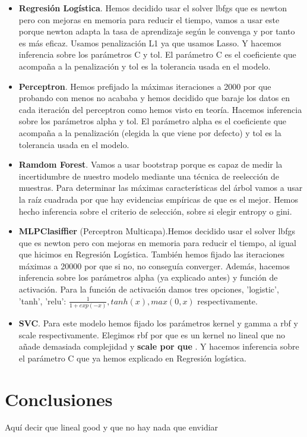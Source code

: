 \documentclass[a4paper,11pt]{article}
\begin{document}
\begin{itemize}

\item \textbf{Regresión Logística}. Hemos decidido usar el solver lbfgs que es newton pero con mejoras en memoria para reducir el tiempo, vamos a usar este porque newton adapta la tasa de aprendizaje según le convenga y por tanto es más eficaz. Usamos penalización L1 ya que usamos Lasso. Y hacemos inferencia sobre los parámetros C y tol. El parámetro C es el coeficiente que acompaña a la penalización y tol es la tolerancia usada en el modelo.

\item \textbf{Perceptron}. Hemos prefijado la máximas iteraciones a 2000 por que probando con menos no acababa y hemos decidido que baraje los datos en cada iteración del perceptron como hemos visto en teoría. Hacemos inferencia sobre los parámetros alpha y tol. El parámetro alpha es el coeficiente que acompaña a la penalización (elegida la que viene por defecto) y tol es la tolerancia usada en el modelo.

\item \textbf{Ramdom Forest}. Vamos a usar bootstrap porque es capaz de medir la incertidumbre de nuestro modelo mediante una técnica de reelección de muestras. Para determinar las máximas características del árbol vamos a usar la raíz cuadrada por que hay evidencias empíricas de que es el mejor. Hemos hecho inferencia sobre el criterio de selección, sobre si elegir entropy o gini. 

\item \textbf{MLPClasiffier} (Perceptron Multicapa).Hemos decidido usar el solver lbfgs que es newton pero con mejoras en memoria para reducir el tiempo, al igual que hicimos en Regresión Logística. También hemos fijado las iteraciones máximas a 20000 por que si no, no conseguía converger. Además, hacemos inferencia sobre los parámetros alpha (ya explicado antes) y función de activación. Para la función de activación damos tres opciones, 'logistic', 'tanh', 'relu': $ \frac{1}{1 + exp(-x)} , tanh(x), max(0, x)$ respectivamente.

\item \textbf{SVC}. Para este modelo hemos fijado los parámetros kernel y gamma a rbf y scale respectivamente. Elegimos rbf por que es un kernel no lineal que no añade demasiada complejidad y \textbf{ scale por que }. Y hacemos inferencia sobre el parámetro C que ya hemos explicado en Regresión logística.

\end{itemize}

\section{Conclusiones}

Aquí decir que lineal good y que no hay nada que envidiar



\end{document}
